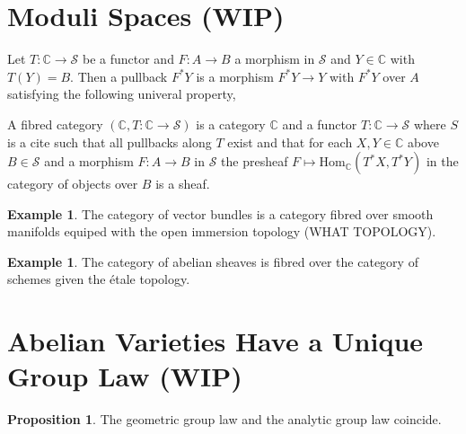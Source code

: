 \documentclass[12pt]{extarticle}
\newcommand{\Hom}[3]{\mathrm{Hom}_{#1}\left( #2, #3 \right)}
\theoremstyle{definition}
\newtheorem{proposition}[theorem]{Proposition}
\newtheorem{example}[theorem]{Example}
\newenvironment{definition}[1][Definition:]{\begin{trivlist}
\item[\hskip \labelsep {\bfseries #1}]}{\end{trivlist}}
\newcommand{\C}{\mathbb{C}}
\begin{document}
\section{Moduli Spaces (WIP)}

\begin{definition}

\end{definition}

\renewcommand{\S}{\mathcal{S}}

\begin{definition}
Let $T : \C \to \S$ be a functor and $F : A \to B$ a morphism in $\S$ and $Y \in \C$ with $T(Y) = B$. Then a pullback $F^* Y$ is a morphism $F^* Y \to Y$ with $F^* Y$ over $A$ satisfying the following univeral property,
\begin{center}
\end{center}
\end{definition}

\begin{definition}
A fibred category $(\C, T : \C \to \S)$ is a category $\C$ and a functor $T : \C \to \S$ where $S$ is a cite such that all pullbacks along $T$ exist and that for each $X,Y \in \C$ above $B \in \S$ and a morphism $F : A \to B$ in $\S$ the presheaf $F \mapsto \Hom{\C}{T^* X}{T^* Y}$ in the category of objects over $B$ is a sheaf. 
\end{definition}

\begin{example}
The category of vector bundles is a category fibred over smooth manifolds equiped with the open immersion topology (WHAT TOPOLOGY). 
\end{example}

\begin{example}
The category of abelian sheaves is fibred over the category of schemes given the \'{e}tale topology. 
\end{example}

\section{Abelian Varieties Have a Unique Group Law (WIP)} 

\begin{proposition}
The geometric group law and the analytic group law coincide.
\end{proposition}
\end{document}
